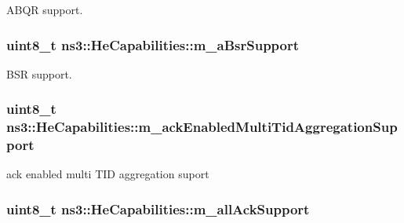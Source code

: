 A\+B\+QR support. 

\subsubsection[{\texorpdfstring{m\+\_\+a\+Bsr\+Support}{m_aBsrSupport}}]{\setlength{\rightskip}{0pt plus 5cm}uint8\+\_\+t ns3\+::\+He\+Capabilities\+::m\+\_\+a\+Bsr\+Support\hspace{0.3cm}{\ttfamily [private]}}\hypertarget{classns3_1_1HeCapabilities_aa7a38ebf70a7133df40a734171f542b2}{}\label{classns3_1_1HeCapabilities_aa7a38ebf70a7133df40a734171f542b2}


B\+SR support. 

\subsubsection[{\texorpdfstring{m\+\_\+ack\+Enabled\+Multi\+Tid\+Aggregation\+Support}{m_ackEnabledMultiTidAggregationSupport}}]{\setlength{\rightskip}{0pt plus 5cm}uint8\+\_\+t ns3\+::\+He\+Capabilities\+::m\+\_\+ack\+Enabled\+Multi\+Tid\+Aggregation\+Support\hspace{0.3cm}{\ttfamily [private]}}\hypertarget{classns3_1_1HeCapabilities_a483ff6eafe4090c371f997f3b3d00533}{}\label{classns3_1_1HeCapabilities_a483ff6eafe4090c371f997f3b3d00533}


ack enabled multi T\+ID aggregation suport 

\subsubsection[{\texorpdfstring{m\+\_\+all\+Ack\+Support}{m_allAckSupport}}]{\setlength{\rightskip}{0pt plus 5cm}uint8\+\_\+t ns3\+::\+He\+Capabilities\+::m\+\_\+all\+Ack\+Support\hspace{0.3cm}{\ttfamily [private]}}\hypertarget{classns3_1_1HeCapabilities_a36325eaad1246d1ee77dbdbae43c608c}{}\label{classns3_1_1HeCapabilities_a36325eaad1246d1ee77dbdbae43c608c}


